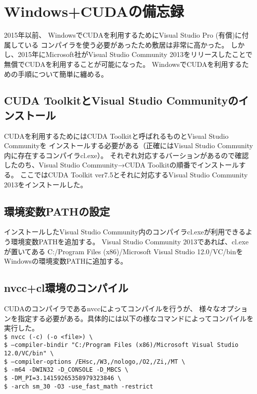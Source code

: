 \chapter{Windows+CUDAの備忘録}
2015年以前、
WindowsでCUDAを利用するためにVisual Studio Pro (有償)に付属している
コンパイラを使う必要があったため敷居は非常に高かった。
しかし、2015年にMicrosoft社がVisual Studio Community 2013をリリースしたことで
無償でCUDAを利用することが可能になった。
WindowsでCUDAを利用するための手順について簡単に纏める。
\section{CUDA ToolkitとVisual Studio Communityのインストール}
CUDAを利用するためにはCUDA Toolkitと呼ばれるものとVisual Studio Communityを
インストールする必要がある（正確にはVisual Studio Community内に存在するコンパイラcl.exe）。
それぞれ対応するバーションがあるので確認したのち、Visual Studio Community→CUDA Toolkitの順番でインストールする。
ここではCUDA Toolkit ver7.5とそれに対応するVisual Studio Community 2013をインストールした。
\section{環境変数PATHの設定}
インストールしたVisual Studio Community内のコンパイラcl.exeが利用できるよう環境変数PATHを追加する。
Visual Studio Community 2013であれば、cl.exeが置いてある
C:/Program Files (x86)/Microsoft Visual Studio 12.0/VC/binを
Windowsの環境変数PATHに追加する。
\section{nvcc+cl環境のコンパイル}
CUDAのコンパイラであるnvccによってコンパイルを行うが、
様々なオプションを指定する必要がある。具体的には以下の様なコマンドによってコンパイルを実行した。\\
\texttt{\$ nvcc (-c) (-o <file>) \textbackslash}\\
\texttt{\$ --compiler-bindir "C:/Program Files (x86)/Microsoft Visual Studio 12.0/VC/bin" \textbackslash}\\
\texttt{\$ --compiler-options  /EHsc,/W3,/nologo,/O2,/Zi,/MT \textbackslash}\\
\texttt{\$ -m64 -DWIN32 -D\_CONSOLE -D\_MBCS \textbackslash}\\
\texttt{\$ -DM\_PI=3.14159265358979323846 \textbackslash}\\
\texttt{\$ -arch sm\_30 -O3 -use\_fast\_math -restrict}

